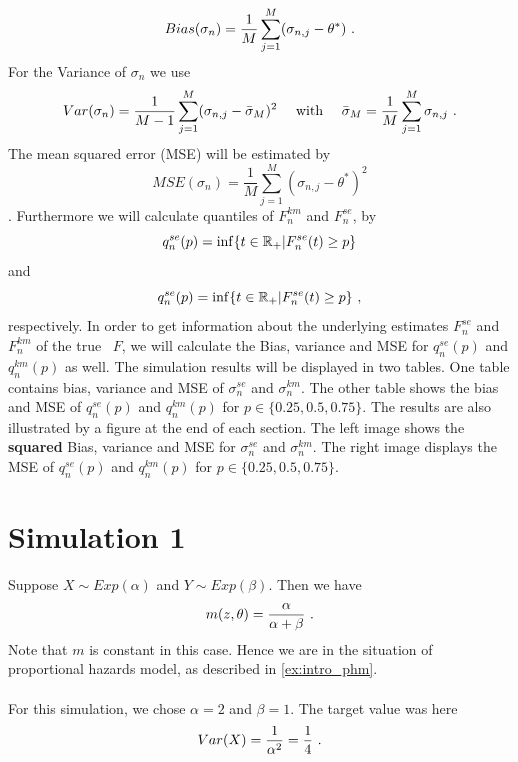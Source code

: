 $$Bias(\sigma_n) = \frac{1}{M}\sum_{j=1}^{M}(\sigma_{n,j} - \theta^*)\textrm{ .}$$
For the Variance of $\sigma_n$ we use
$$Var(\sigma_n) = \frac{1}{M-1}\sum_{j=1}^{M}(\sigma_{n,j} - \bar\sigma_M)^2 \quad\text{ with }\quad \bar\sigma_M = \frac{1}{M} \sum_{j=1}^{M} \sigma_{n,j}\textrm{ .}$$
The mean squared error (MSE) will be estimated by
$$MSE(\sigma_n) = \frac{1}{M}\sum_{j=1}^{M}(\sigma_{n,j} - \theta^*)^2$$. 
Furthermore we will calculate quantiles of $F_n^{km}$ and $F_n^{se}$, by
$$q_n^{se}(p) = \inf\{t \in \mathbb{R}_+| F_n^{se}(t) \geq p\}$$
and
$$q_n^{se}(p) = \inf\{t \in \mathbb{R}_+| F_n^{se}(t) \geq p\}\textrm{ ,}$$
respectively. In order to get information about the underlying estimates $F_n^{se}$ and $F_n^{km}$ of the true \df\ $F$, we will calculate the Bias, variance and MSE for $q_n^{se}(p)$ and $q_n^{km}(p)$ as well. The simulation results will be displayed in two tables. One table contains bias, variance and MSE of $\sigma_n^{se}$ and $\sigma_{n}^{km}$. The other table shows the bias and MSE of $q_n^{se}(p)$ and $q_n^{km}(p)$ for $p\in\{0.25, 0.5, 0.75\}$. The results are also illustrated by a figure at the end of each section. The left image shows the \textbf{squared} Bias, variance and MSE for $\sigma_n^{se}$ and $\sigma_n^{km}$. The right image displays the MSE of $q_n^{se}(p)$ and $q_n^{km}(p)$ for $p\in\{0.25, 0.5, 0.75\}$.
%
%
%
\section{Simulation 1} \label{sec:sim_expexp}
Suppose $X \sim Exp(\alpha)$ and $Y\sim Exp(\beta)$. Then we have
$$m(z,\theta) = \frac{\alpha}{\alpha + \beta}\textrm{ .}$$
Note that $m$ is constant in this case. Hence we are in the situation of proportional hazards model, as described in \ref{ex:intro_phm}.\\
\\
For this simulation, we chose $\alpha = 2$ and $\beta = 1$. The target value was here
$$Var(X) = \frac{1}{\alpha^2}=\frac{1}{4}\textrm{ .}$$

